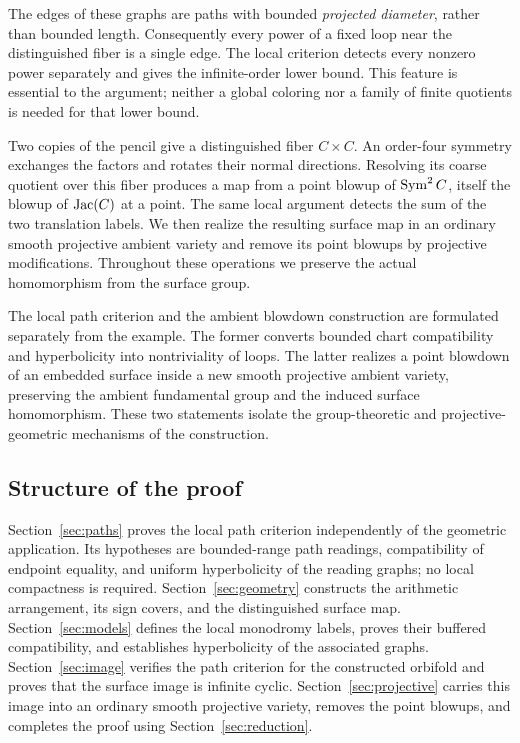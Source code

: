 The edges of these graphs are paths with bounded \emph{projected
diameter}, rather than bounded length.  Consequently every power of a
fixed loop near the distinguished fiber is a single edge.  The local
criterion detects every nonzero power separately and gives the
infinite-order lower bound.  This feature is essential to the argument;
neither a global coloring nor a family of finite quotients is needed
for that lower bound.

Two copies of the pencil give a distinguished fiber $C\times C$.
An order-four symmetry exchanges the factors and rotates their normal
directions.  Resolving its coarse quotient over this fiber produces a
map from a point blowup of
$\operatorname{Sym}^2 C$, itself the blowup of $\operatorname{Jac}(C)$ at a point.  The same local
argument detects the sum of the two translation labels.  We then
realize the resulting surface map in an ordinary smooth projective
ambient variety and remove its point blowups by projective
modifications.  Throughout these operations we preserve the actual
homomorphism from the surface group.

The local path criterion and the ambient blowdown construction are
formulated separately from the example.  The former converts bounded
chart compatibility and hyperbolicity into nontriviality of loops.
The latter realizes a point blowdown of an embedded surface inside a
new smooth projective ambient variety, preserving the ambient
fundamental group and the induced surface homomorphism.  These two
statements isolate the group-theoretic and projective-geometric
mechanisms of the construction.

\subsection{Structure of the proof}
Section~\ref{sec:paths} proves the local path criterion independently
of the geometric application.  Its hypotheses are bounded-range path
readings, compatibility of endpoint equality, and uniform hyperbolicity
of the reading graphs; no local compactness is required.
Section~\ref{sec:geometry} constructs the arithmetic arrangement,
its sign covers, and the distinguished surface map.
Section~\ref{sec:models} defines the local monodromy labels, proves
their buffered compatibility, and establishes hyperbolicity of the
associated graphs.  Section~\ref{sec:image} verifies the path
criterion for the constructed orbifold and proves that the surface
image is infinite cyclic.  Section~\ref{sec:projective} carries this
image into an ordinary smooth projective variety, removes the point
blowups, and completes the proof using Section~\ref{sec:reduction}.

